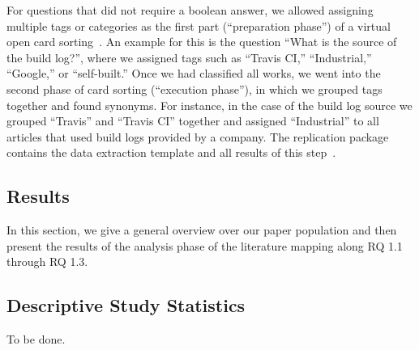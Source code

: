 For questions that did not require a boolean answer, we allowed assigning
multiple tags or categories as the first part (``preparation phase'')
of a virtual open card sorting~\cite{zimmermann2016card}.
An example for this is the question ``What is the source of the build
log?'',
where we assigned tags such as ``Travis CI,''
``Industrial,'' ``Google,'' or
``self-built.''
Once we had classified all works, we went into the second phase of
card sorting
(``execution phase''), in which we grouped tags
together and found synonyms.
For instance, in the case of the build log source we grouped
``Travis'' and ``Travis CI'' together and assigned ``Industrial'' to
all articles that used build logs provided by a company.
The replication package contains the data extraction template and all
results of this step~\cite{brandt2020chunk-replication}.


\subsection{Results}
\addtolength{\tabcolsep}{-5pt}

In this section, we give a general overview over our paper population
and then present the results of the analysis phase of the literature
mapping along RQ 1.1 through RQ 1.3.


\subsection{Descriptive Study Statistics}
To be done.


